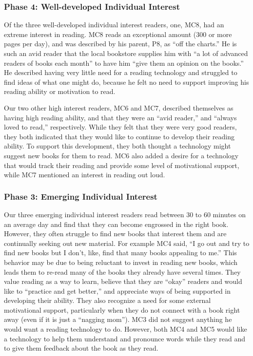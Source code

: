 \documentclass{sigchi}
\begin{document}
\subsubsection{Phase 4: Well-developed Individual Interest}
Of the three well-developed individual interest readers, one, MC8, had an extreme interest in reading. MC8 reads an exceptional amount (300 or more pages per day), and was described by his parent, P8, as ``off the charts.'' He is such an avid reader that the local bookstore supplies him with ``a lot of advanced readers of books each month'' to have him ``give them an opinion on the books.'' He described having very little need for a reading technology and struggled to find ideas of what one might do, because he felt no need to support improving his reading ability or motivation to read.

Our two other high interest readers, MC6 and MC7, described themselves as having high reading ability, and that they were an ``avid reader,'' and ``always loved to read,'' respectively. While they felt that they were very good readers, they both indicated that they would like to continue to develop their reading ability. To support this development, they both thought a technology might suggest new books for them to read. MC6 also added a desire for a technology that would track their reading and provide some level of motivational support, while MC7 mentioned an interest in reading out loud.

\subsubsection{Phase 3: Emerging Individual Interest}
Our three emerging individual interest readers read between 30 to 60 minutes on an average day and find that they can become engrossed in the right book. However, they often struggle to find new books that interest them and are continually seeking out new material. For example MC4 said, ``I go out and try to find new books but I don't, like, find that many books appealing to me.'' This behavior may be due to being reluctant to invest in reading new books, which leads them to re-read many of the books they already have several times. They value reading as a way to learn, believe that they are ``okay'' readers and would like to ``practice and get better,'' and appreciate ways of being supported in developing their ability. They also recognize a need for some external motivational support, particularly when they do not connect with a book right away (even if it is just a ``nagging mom''). MC3 did not suggest anything he would want a reading technology to do. However, both MC4 and MC5 would like a technology to help them understand and pronounce words while they read and to give them feedback about the book as they read.
\end{document}
